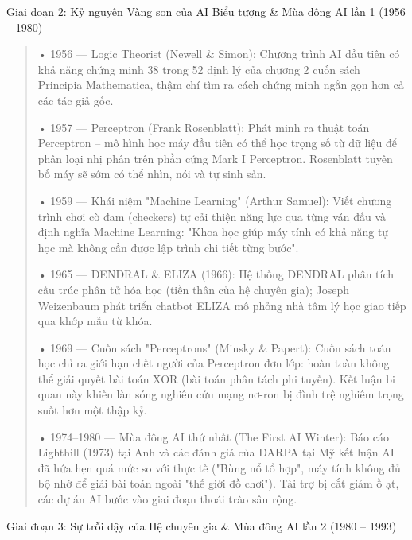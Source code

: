 Giai đoạn 2: Kỷ nguyên Vàng son của AI Biểu tượng \& Mùa đông AI lần 1
(1956 -- 1980)

\begin{quote}
• 1956 --- Logic Theorist (Newell \& Simon): Chương trình AI đầu tiên có
khả năng chứng minh 38 trong 52 định lý của chương 2 cuốn sách Principia
Mathematica, thậm chí tìm ra cách chứng minh ngắn gọn hơn cả các tác giả
gốc.

• 1957 --- Perceptron (Frank Rosenblatt): Phát minh ra thuật toán
Perceptron -- mô hình học máy đầu tiên có thể học trọng số từ dữ liệu để
phân loại nhị phân trên phần cứng Mark I Perceptron. Rosenblatt tuyên bố
máy sẽ sớm có thể nhìn, nói và tự sinh sản.

• 1959 --- Khái niệm "Machine Learning" (Arthur Samuel): Viết chương
trình chơi cờ đam (checkers) tự cải thiện năng lực qua từng ván đấu và
định nghĩa Machine Learning: "Khoa học giúp máy tính có khả năng tự học
mà không cần được lập trình chi tiết từng bước".

• 1965 --- DENDRAL \& ELIZA (1966): Hệ thống DENDRAL phân tích cấu trúc
phân tử hóa học (tiền thân của hệ chuyên gia); Joseph Weizenbaum phát
triển chatbot ELIZA mô phỏng nhà tâm lý học giao tiếp qua khớp mẫu từ
khóa.

• 1969 --- Cuốn sách "Perceptrons" (Minsky \& Papert): Cuốn sách toán
học chỉ ra giới hạn chết người của Perceptron đơn lớp: hoàn toàn không
thể giải quyết bài toán XOR (bài toán phân tách phi tuyến). Kết luận bi
quan này khiến làn sóng nghiên cứu mạng nơ-ron bị đình trệ nghiêm trọng
suốt hơn một thập kỷ.

• 1974--1980 --- Mùa đông AI thứ nhất (The First AI Winter): Báo cáo
Lighthill (1973) tại Anh và các đánh giá của DARPA tại Mỹ kết luận AI đã
hứa hẹn quá mức so với thực tế ("Bùng nổ tổ hợp", máy tính không đủ bộ
nhớ để giải bài toán ngoài "thế giới đồ chơi"). Tài trợ bị cắt giảm ồ
ạt, các dự án AI bước vào giai đoạn thoái trào sâu rộng.
\end{quote}

Giai đoạn 3: Sự trỗi dậy của Hệ chuyên gia \& Mùa đông AI lần 2 (1980 --
1993)

